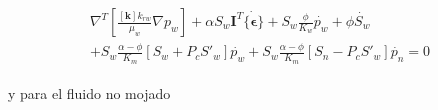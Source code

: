 \begin{ceqn} 
\begin{subequations} \label{eq:equ344} 
\begin{gather}
\begin{multlined}
\nabla^T \left[\frac{[\mathbf{k}] k_{rw}}{\mu_{w}}\nabla p_{w}\right]
+ \alpha S_{w}\mathbf{I}^T \dot{\{\mathbf{\epsilon}\}} + S_{w}\frac{\phi}{K_{w}}\dot{p_{w}} + \phi\dot{S_{w}}\\[10pt]
+ S_{w} \frac{\alpha - \phi}{K_m}\left[S_w + P_c S'_w\right]\dot{p_w} 
+ S_{w} \frac{\alpha - \phi}{K_m}\left[S_n - P_c S'_w\right]\dot{p_n} = 0
\end{multlined}
\end{gather}  
\end{subequations} 
\end{ceqn}
\bigskip
y para el fluido no mojado


